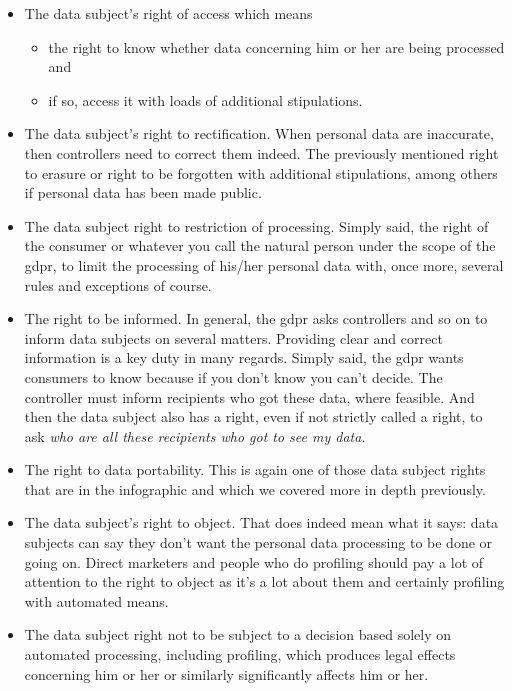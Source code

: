 \documentclass[thesis=M,english]{FITthesis}[2012/06/26]
\begin{document}
\begin{itemize}[nosep]
\item  The data subject’s right of access which means 
	\begin{itemize}[nosep]
	\item  the right to know whether data concerning him or her are being processed and 
	\item  if so, access it with loads of additional stipulations.
	\end{itemize}
\item  The data subject’s right to rectification. When personal data are inaccurate, then controllers need to correct them indeed.
The previously mentioned right to erasure or right to be forgotten with additional stipulations, among others if personal data has been made public.
\item The data subject right to restriction of processing. Simply said, the right of the consumer or whatever you call the natural person under the scope of the \acrshort{gdpr}, to limit the processing of his/her personal data with, once more, several rules and exceptions of course.
\item  The right to be informed. In general, the \acrshort{gdpr} asks controllers and so on to inform data subjects on several matters. Providing clear and correct information is a key duty in many regards. Simply said, the \acrshort{gdpr} wants consumers to know because if you don’t know you can’t decide. The controller must inform recipients who got these data, where feasible. And then the data subject also has a right, even if not strictly called a right, to ask \textit{who are all these recipients who got to see my data}. 
\item  The right to data portability. This is again one of those data subject rights that are in the infographic and which we covered more in depth previously.
\item  The data subject’s right to object. That does indeed mean what it says: data subjects can say they don’t want the personal data processing to be done or going on. Direct marketers and people who do profiling should pay a lot of attention to the right to object as it’s a lot about them and certainly profiling with automated means.
\item  The data subject right not to be subject to a decision based solely on automated processing, including profiling, which produces legal effects concerning him or her or similarly significantly affects him or her.\\
\end{itemize}
\end{document}
